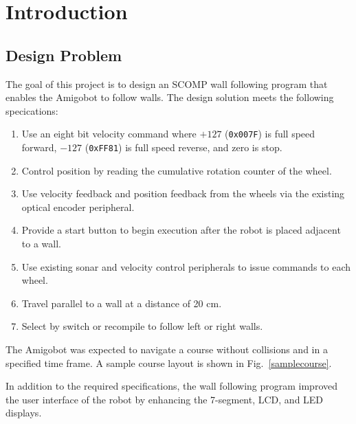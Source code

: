 \section{Introduction}
\subsection{Design Problem}
The goal of this project is to design an SCOMP wall following program
that enables the Amigobot to follow walls. The design solution meets
the following specications:

\begin{enumerate}
\item Use an eight bit velocity command where \(+127\) (\verb+0x007F+)
  is full speed forward, \(-127\) (\verb+0xFF81+) is full speed
  reverse, and zero is stop.
\item Control position by reading the cumulative rotation counter of
  the wheel.
\item Use velocity feedback and position feedback from the wheels via
  the existing optical encoder peripheral.
\item Provide a start button to begin execution after the robot is
  placed adjacent to a wall.
\item Use existing sonar and velocity control peripherals to issue
  commands to each wheel.
\item Travel parallel to a wall at a distance of 20 cm.
\item Select by switch or recompile to follow left or right walls.
\end{enumerate}

The Amigobot was expected to navigate a course without collisions and
in a specified time frame. A sample course layout is shown in
Fig.~\ref{samplecourse}.

In addition to the required specifications, the wall following program
improved the user interface of the robot by enhancing the 7-segment,
LCD, and LED displays.

\begin{figure}[h!]
  \centering \cprotect {}\end{figure}

